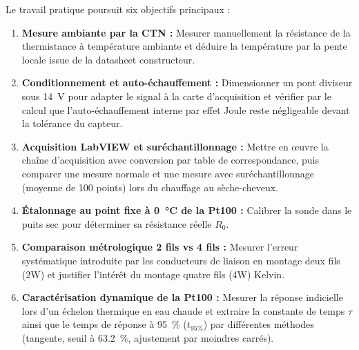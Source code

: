 Le travail pratique poursuit six objectifs principaux :
\begin{enumerate}[leftmargin=1.2cm]
    \item \textbf{Mesure ambiante par la CTN :} Mesurer manuellement la résistance de la thermistance à température ambiante et déduire la température par la pente locale issue de la datasheet constructeur.
    \item \textbf{Conditionnement et auto-échauffement :} Dimensionner un pont diviseur sous \qty{14}{\volt} pour adapter le signal à la carte d'acquisition et vérifier par le calcul que l'auto-échauffement interne par effet Joule reste négligeable devant la tolérance du capteur.
    \item \textbf{Acquisition LabVIEW et suréchantillonnage :} Mettre en œuvre la chaîne d'acquisition avec conversion par table de correspondance, puis comparer une mesure normale et une mesure avec suréchantillonnage (moyenne de 100 points) lors du chauffage au sèche-cheveux.
    \item \textbf{Étalonnage au point fixe à \qty{0}{\degreeCelsius} de la Pt100 :} Calibrer la sonde dans le puits sec pour déterminer sa résistance réelle $R_0$.
    \item \textbf{Comparaison métrologique 2 fils vs 4 fils :} Mesurer l'erreur systématique introduite par les conducteurs de liaison en montage deux fils (2W) et justifier l'intérêt du montage quatre fils (4W) Kelvin.
    \item \textbf{Caractérisation dynamique de la Pt100 :} Mesurer la réponse indicielle lors d'un échelon thermique en eau chaude et extraire la constante de temps $\tau$ ainsi que le temps de réponse à \qty{95}{\percent} ($t_{95\%}$) par différentes méthodes (tangente, seuil à \qty{63.2}{\percent}, ajustement par moindres carrés).
\end{enumerate}
